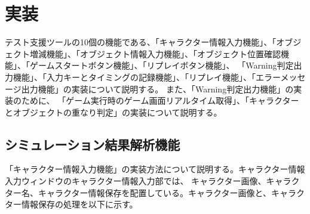 \chapter{実装}\label{cha:Implementation}
テスト支援ツールの10個の機能である、「キャラクター情報入力機能」、「オブジェクト増減機能」、「オブジェクト情報入力機能」、「オブジェクト位置確認機能」、「ゲームスタートボタン機能」、「リプレイボタン機能」、
「Warning判定出力機能」、「入力キーとタイミングの記録機能」、「リプレイ機能」、「エラーメッセージ出力機能」の実装について説明する。
また、「Warning判定出力機能」の実装のために、
「ゲーム実行時のゲーム画面リアルタイム取得」、「キャラクターとオブジェクトの重なり判定」の実装について説明する。


\section{シミュレーション結果解析機能}\label{kyap_re}
「キャラクター情報入力機能」の実装方法について説明する。キャラクター情報入力ウィンドウのキャラクター情報入力部では、
キャラクター画像、キャラクター名、キャラクター情報保存を配置している。キャラクター画像と、キャラクター情報保存の処理を以下に示す。


